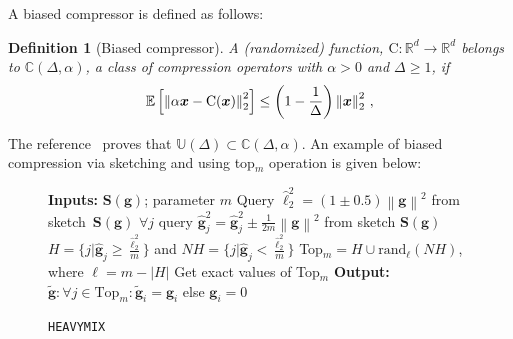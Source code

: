 \documentclass[11pt]{article}
\newtheorem{lemma}{Lemma}
\newtheorem{definition}{Definition}
\begin{document}
A biased compressor is defined as follows:
\begin{definition}[Biased compressor]
A (randomized) function,  ${\text{C}}:\mathbb{R}^{d}\rightarrow\mathbb{R}^{d}$ belongs to $\mathbb{C}(\Delta,\alpha)$, a class of compression operators with $\alpha>0$ and $\Delta\geq 1$, if
\begin{align}\notag
    \mathbb{E}\left[\left\|\alpha\boldsymbol{x}-{\text{C}}(\boldsymbol{x})\right\|^2_2\right]\leq \left(1-\frac{1}{\Delta}\right)\left\|\boldsymbol{x}\right\|^2_2\, ,
\end{align}
\end{definition}
The reference~\citep{horvath2020better} proves that $\mathbb{U}(\Delta)\subset\mathbb{C}(\Delta, \alpha)$.
An example of biased compression via sketching and using top$_m$ operation is given below:
\begin{figure}\vspace{-0.4cm}
\begin{minipage}{\linewidth}
\begin{algorithm}[H]
\caption{\texttt{HEAVYMIX}  }\label{alg:heavymix}
\begin{algorithmic}[1]
\STATE \textbf{Inputs:} $\mathbf{S}({\mathbf{g}})$; parameter $m$
\STATE Query $\hat{\ell}_2^2=\left(1\pm 0.5\right)\left\|\mathbf{g}\right\|^2$ from sketch~$\mathbf{S}(\mathbf{g})$
\STATE $\forall j$ query $\hat{\mathbf{g}}_j^2=\hat{\mathbf{g}}_j^2\pm \frac{1}{2m}\left\|\mathbf{g}\right\|^2$ from sketch $\mathbf{S}(\mathbf{g})$
\STATE $H=\{j|\hat{\mathbf{g}}_j\geq \frac{\hat{\ell}_2^2}{m}\}$ and $NH=\{j|\hat{\mathbf{g}}_j<\frac{\hat{\ell}_2^2}{m}\}$
\STATE Top$_m=H\cup \text{rand}_\ell(NH)$, where $\ell=m-\left|H\right|$
\STATE Get exact values of Top$_m$ 
\STATE \textbf{Output:} $\tilde{\mathbf{g}}:\forall j\in\text{Top}_m:\tilde{\mathbf{g}}_{i}=\mathbf{g}_{i}$ else $ \mathbf{g}_{i}=0$
\end{algorithmic}
\end{algorithm}
\vspace{-0.1in}
\end{minipage}\end{figure}
\end{document}
